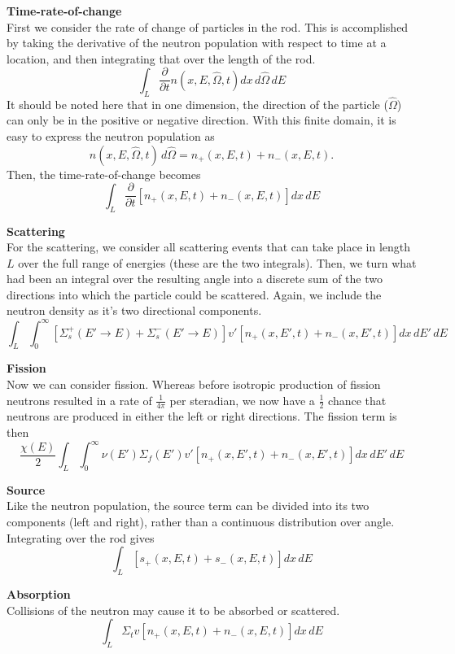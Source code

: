 \documentclass{article}
\begin{document}
\textbf{Time-rate-of-change}\\
First we consider the rate of change of particles in the rod. This is accomplished by taking the derivative of the neutron population with respect to time at a location, and then integrating that over the length of the rod.
$$ \int_L \frac{\partial}{\partial t}n(x,E,\hat{\Omega},t)dx\,d\hat{\Omega}\,dE $$
It should be noted here that in one dimension, the direction of the particle ($\hat{\Omega}$) can only be in the positive or negative direction. With this finite domain, it is easy to express the neutron population as
$$ n(x,E,\hat{\Omega},t)\,d\hat{\Omega} = n_{+}(x,E,t) + n_{-}(x,E,t). $$
Then, the time-rate-of-change becomes
$$ \int_L \frac{\partial}{\partial t}\left[n_{+}(x,E,t) + n_{-}(x,E,t)\right]dx\,dE $$

\textbf{Scattering}\\
For the scattering, we consider all scattering events that can take place in length $L$ over the full range of energies (these are the two integrals). Then, we turn what had been an integral over the resulting angle into a discrete sum of the two directions into which the particle could be scattered. Again, we include the neutron density as it's two directional components.
$$ \int_L \int_0^{\infty} \left[\Sigma_s^{+}(E'\rightarrow E) + \Sigma_s^{-}(E'\rightarrow E)\right] v' \left[n_{+}(x,E',t) + n_{-}(x,E',t)\right]dx\,dE'\,dE$$

\textbf{Fission}\\
Now we can consider fission. Whereas before isotropic production of fission neutrons resulted in a rate of $\frac{1}{4\pi}$ per steradian, we now have a $\frac{1}{2}$ chance that neutrons are produced in either the left or right directions. The fission term is then
$$ \frac{\chi(E)}{2} \int_L \int_0^{\infty} \nu(E') \Sigma_f(E') v' \left[n_{+}(x,E',t) + n_{-}(x,E',t)\right]dx\,dE'\,dE $$

\textbf{Source}\\
Like the neutron population, the source term can be divided into its two components (left and right), rather than a continuous distribution over angle. Integrating over the rod gives
$$ \int_L \left[s_{+}(x,E,t) + s_{-}(x,E,t)\right]dx\,dE $$

\textbf{Absorption}\\
Collisions of the neutron may cause it to be absorbed or scattered.
$$ \int_L \Sigma_t v \left[n_{+}(x,E,t) + n_{-}(x,E,t)\right]dx\,dE $$
\end{document}
